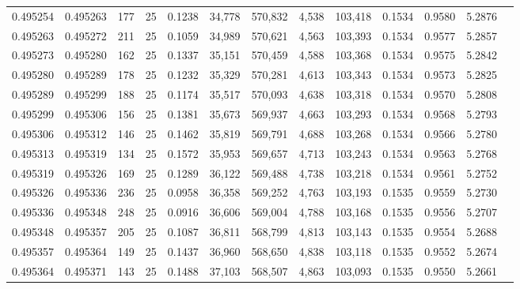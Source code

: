 \begin{tabular}{rrrrrrrrrrrrr}
0.495254 & 0.495263 & 177 &  25 &                                     0.1238 &  34,778 & 570,832 &   4,538 & 103,418 & 0.1534 & 0.9580 & 5.2876 \\
0.495263 & 0.495272 & 211 &  25 &                                     0.1059 &  34,989 & 570,621 &   4,563 & 103,393 & 0.1534 & 0.9577 & 5.2857 \\
0.495273 & 0.495280 & 162 &  25 &                                     0.1337 &  35,151 & 570,459 &   4,588 & 103,368 & 0.1534 & 0.9575 & 5.2842 \\
0.495280 & 0.495289 & 178 &  25 &                                     0.1232 &  35,329 & 570,281 &   4,613 & 103,343 & 0.1534 & 0.9573 & 5.2825 \\
0.495289 & 0.495299 & 188 &  25 &                                     0.1174 &  35,517 & 570,093 &   4,638 & 103,318 & 0.1534 & 0.9570 & 5.2808 \\
0.495299 & 0.495306 & 156 &  25 &                                     0.1381 &  35,673 & 569,937 &   4,663 & 103,293 & 0.1534 & 0.9568 & 5.2793 \\
0.495306 & 0.495312 & 146 &  25 &                                     0.1462 &  35,819 & 569,791 &   4,688 & 103,268 & 0.1534 & 0.9566 & 5.2780 \\
0.495313 & 0.495319 & 134 &  25 &                                     0.1572 &  35,953 & 569,657 &   4,713 & 103,243 & 0.1534 & 0.9563 & 5.2768 \\
0.495319 & 0.495326 & 169 &  25 &                                     0.1289 &  36,122 & 569,488 &   4,738 & 103,218 & 0.1534 & 0.9561 & 5.2752 \\
0.495326 & 0.495336 & 236 &  25 &                                     0.0958 &  36,358 & 569,252 &   4,763 & 103,193 & 0.1535 & 0.9559 & 5.2730 \\
0.495336 & 0.495348 & 248 &  25 &                                     0.0916 &  36,606 & 569,004 &   4,788 & 103,168 & 0.1535 & 0.9556 & 5.2707 \\
0.495348 & 0.495357 & 205 &  25 &                                     0.1087 &  36,811 & 568,799 &   4,813 & 103,143 & 0.1535 & 0.9554 & 5.2688 \\
0.495357 & 0.495364 & 149 &  25 &                                     0.1437 &  36,960 & 568,650 &   4,838 & 103,118 & 0.1535 & 0.9552 & 5.2674 \\
0.495364 & 0.495371 & 143 &  25 &                                     0.1488 &  37,103 & 568,507 &   4,863 & 103,093 & 0.1535 & 0.9550 & 5.2661 \\

\end{tabular}
